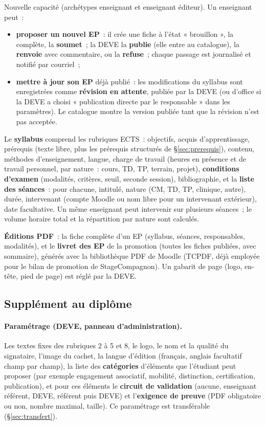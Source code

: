 \documentclass[11pt,a4paper]{article}
\newcommand{\code}[1]{\texttt{\detokenize{#1}}}
\begin{document}
Nouvelle capacité \code{mod/ep:propose} (archétypes enseignant et enseignant éditeur).
Un enseignant peut~:
\begin{itemize}
  \item \textbf{proposer un nouvel EP}~: il crée une fiche à l'état « brouillon », la
    complète, la \textbf{soumet}~; la DEVE la \textbf{publie} (elle entre au catalogue),
    la \textbf{renvoie} avec commentaire, ou la \textbf{refuse}~; chaque passage est
    journalisé et notifié par courriel~;
  \item \textbf{mettre à jour son EP} déjà publié~: les modifications du syllabus sont
    enregistrées comme \textbf{révision en attente}, publiée par la DEVE (ou d'office si
    la DEVE a choisi « publication directe par le responsable » dans les paramètres). Le
    catalogue montre la version publiée tant que la révision n'est pas acceptée.
\end{itemize}
Le \textbf{syllabus} comprend les rubriques ECTS~: objectifs, acquis d'apprentissage,
prérequis (texte libre, plus les prérequis structurés de §\ref{sec:prerequis}), contenu,
méthodes d'enseignement, langue, charge de travail (heures en présence et de travail
personnel, par nature~: cours, TD, TP, terrain, projet), \textbf{conditions d'examen}
(modalités, critères, seuil, seconde session), bibliographie, et la \textbf{liste des
séances}~: pour chacune, intitulé, nature (CM, TD, TP, clinique, autre), durée, intervenant
(compte Moodle ou nom libre pour un intervenant extérieur), date facultative. Un même
enseignant peut intervenir sur plusieurs séances~; le volume horaire total et la
répartition par nature sont calculés.

\textbf{Éditions PDF}~: la fiche complète d'un EP (syllabus, séances, responsables,
modalités), et le \textbf{livret des EP} de la promotion (toutes les fiches publiées, avec
sommaire), générés avec la bibliothèque PDF de Moodle (TCPDF, déjà employée pour le bilan
de promotion de StageCompagnon). Un gabarit de page (logo, en-tête, pied de page) est
réglé par la DEVE.

\subsection{Supplément au diplôme}\label{sec:supplement}

\paragraph{Paramétrage (DEVE, panneau d'administration).} Les textes fixes des rubriques
2 à 5 et 8, le logo, le nom et la qualité du signataire, l'image du cachet, la langue
d'édition (français, anglais facultatif champ par champ), la liste des \textbf{catégories}
d'éléments que l'étudiant peut proposer (par exemple engagement associatif, mobilité,
distinction, certification, publication), et pour ces éléments le \textbf{circuit de
validation} (aucune, enseignant référent, DEVE, référent puis DEVE) et l'\textbf{exigence
de preuve} (PDF obligatoire ou non, nombre maximal, taille). Ce paramétrage est
transférable (§\ref{sec:transfert}).
\end{document}
